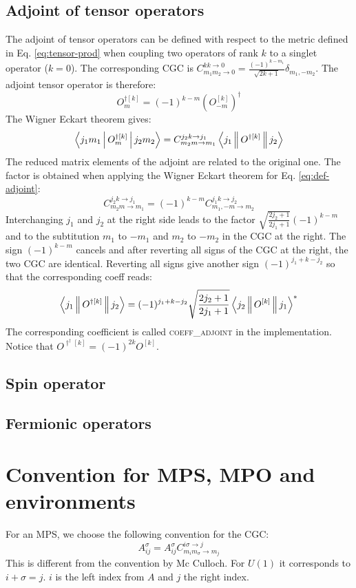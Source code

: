 \documentclass[a4paper,10pt,parskip=full]{scrartcl}
\begin{document}
\subsection{Adjoint of tensor operators}
The adjoint of tensor operators can be defined with respect to the metric defined in
Eq. \eqref{eq:tensor-prod} when coupling two operators of rank $k$ to
a singlet operator ($k=0$). The corresponding CGC is
$C^{kk\rightarrow 0}_{m_1m_2\rightarrow 0}=\frac{(-1)^{k-m_1}}{\sqrt{2k+1}}\delta_{m_1,-m_2}$.
The adjoint tensor operator is therefore:
\begin{equation}
  \label{eq:def-adjoint}
  O^{\dagger [k]}_m = (-1)^{k-m}\left(O^{[k]}_{-m}\right)^\dagger
\end{equation}
The Wigner Eckart theorem gives:
\begin{equation}
  \Braket{j_1m_1|O^{\dagger [k]}_m|j_2m_2}=C^{j_2k\rightarrow j_1}_{m_2m\rightarrow m_1}\Braket{j_1||O^{\dagger[k]}||j_2}
\end{equation}
The reduced matrix elements of the adjoint are related to the original one.
The factor is obtained when applying the Wigner Eckart theorem for Eq. \eqref{eq:def-adjoint}:
\begin{equation}
  C^{j_2k\rightarrow j_1}_{m_2m\rightarrow m_1} = (-1)^{k-m} C^{j_1k\rightarrow j_2}_{m_1,-m\rightarrow m_2}
\end{equation}
Interchanging $j_1$ and $j_2$ at the right side leads to the factor $\sqrt{\frac{2j_2+1}{2j_1+1}}(-1)^{k-m}$
and to the subtitution $m_1$ to $-m_1$ and $m_2$ to $-m_2$ in the CGC at the right.
The sign $(-1)^{k-m}$ cancels and after reverting all signs of the CGC at the right, the two
CGC are identical. Reverting all signs give another sign $(-1)^{j_1+k-j_2}$ so that the corresponding coeff reads:
\begin{equation}
  \Braket{j_1||O^{\dagger[k]}||j_2} = (-1)^{j_1+k-j_2}\sqrt{\frac{2j_2+1}{2j_1+1}}\Braket{j_2||O^{[k]}||j_1}^*
\end{equation}
The corresponding coefficient is called \textsc{coeff\_adjoint} in the implementation.
Notice that $O^{\dagger^\dagger[k]}=(-1)^{2k}O^{[k]}$.
\subsection{Spin operator}

\subsection{Fermionic operators}
\section{Convention for MPS, MPO and environments}
For an MPS, we choose the following convention for the CGC:
\begin{equation}
  \label{eq:mps-def}
  A^\sigma_{ij} = A^\sigma_{ij}C^{i\sigma\rightarrow j}_{m_im_\sigma\rightarrow m_j}
\end{equation}
This is different from the convention by Mc Culloch. For $U(1)$ it corresponds to $i+\sigma=j$.
$i$ is the left index from $A$ and $j$ the right index.
\end{document}
